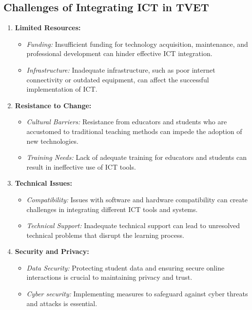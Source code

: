 \documentclass[10pt]{article}
\begin{document}
\subsection*{Challenges of Integrating ICT in TVET}

\begin{enumerate}
    \item \textbf{Limited Resources:}
    \begin{itemize}
        \item \textit{Funding:} Insufficient funding for technology acquisition, maintenance, and professional development can hinder effective ICT integration.
        \item \textit{Infrastructure:} Inadequate infrastructure, such as poor internet connectivity or outdated equipment, can affect the successful implementation of ICT.
    \end{itemize}
    \item \textbf{Resistance to Change:}
    \begin{itemize}
        \item \textit{Cultural Barriers:} Resistance from educators and students who are accustomed to traditional teaching methods can impede the adoption of new technologies.
        \item \textit{Training Needs:} Lack of adequate training for educators and students can result in ineffective use of ICT tools.
    \end{itemize}
    \item \textbf{Technical Issues:}
    \begin{itemize}
        \item \textit{Compatibility:} Issues with software and hardware compatibility can create challenges in integrating different ICT tools and systems.
        \item \textit{Technical Support:} Inadequate technical support can lead to unresolved technical problems that disrupt the learning process.
    \end{itemize}
    \item \textbf{Security and Privacy:}
    \begin{itemize}
        \item \textit{Data Security:} Protecting student data and ensuring secure online interactions is crucial to maintaining privacy and trust.
        \item \textit{Cyber security:} Implementing measures to safeguard against cyber threats and attacks is essential.
    \end{itemize}
\end{enumerate}
\end{document}
